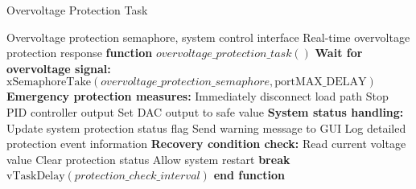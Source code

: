 \documentclass{article}
\begin{document}
\begin{algorithm}
\caption{Overvoltage Protection Task}
\label{alg:overvoltage_protection}
\begin{algorithmic}[1]
\REQUIRE Overvoltage protection semaphore, system control interface
\ENSURE Real-time overvoltage protection response
\STATE \textbf{function} $overvoltage\_protection\_task()$
    \STATE \textbf{Wait for overvoltage signal:}
    \STATE $\text{xSemaphoreTake}(overvoltage\_protection\_semaphore, \text{portMAX\_DELAY})$
    \STATE
    \STATE \textbf{Emergency protection measures:}
    \STATE Immediately disconnect load path 
    \STATE Stop PID controller output
    \STATE Set DAC output to safe value
    \STATE
    \STATE \textbf{System status handling:}
    \STATE Update system protection status flag
    \STATE Send warning message to GUI
    \STATE Log detailed protection event information
    \STATE
    \STATE \textbf{Recovery condition check:}
        \STATE Read current voltage value
            \STATE Clear protection status
            \STATE Allow system restart
            \STATE \textbf{break}
        \ENDIF
        \STATE $\text{vTaskDelay}(protection\_check\_interval)$
    \ENDWHILE
\ENDWHILE
\STATE \textbf{end function}
\end{algorithmic}
\end{algorithm}
\end{document}
